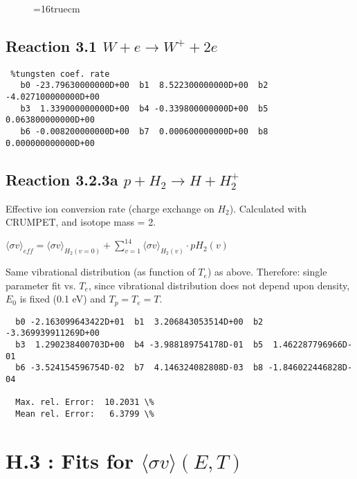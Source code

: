\documentclass[12pt,dvipdfmx]{article}
\begin{document}
\begin{figure} \label{2.26B}
\epsfxsize=16truecm
\end{figure}

\subsection{
Reaction 3.1 $W + e \rightarrow W^+ + 2e $ }

\begin{small}\begin{verbatim} %tungsten coef. rate
   b0 -23.79630000000D+00  b1  8.522300000000D+00  b2 -4.027100000000D+00
   b3  1.339000000000D+00  b4 -0.339800000000D+00  b5  0.063800000000D+00
   b6 -0.008200000000D+00  b7  0.000600000000D+00  b8  0.000000000000D+00
\end{verbatim}\end{small}

\newpage

\subsection{
Reaction 3.2.3a   $p + H_2 \rightarrow H + H_2^+  $
}

  Effective ion conversion rate (charge exchange on $H_2$). Calculated with CRUMPET, and isotope mass = 2. 

  $ \langle\sigma v \rangle_{eff} = \langle\sigma v \rangle_{H_2(v=0)} + \sum_{v=1}^{14}
\langle\sigma v \rangle_{H_2(v)} \cdot pH_2(v) $

  Same vibrational distribution (as function of $T_e$) as above.
  Therefore:
  single parameter fit vs. $T_e$,
  since vibrational distribution does not depend upon density, $E_0$ is fixed
  (0.1 eV) and $T_p = T_e = T$.

\begin{small}\begin{verbatim}
  b0 -2.163099643422D+01  b1  3.206843053514D+00  b2 -3.369939911269D+00
  b3  1.290238400703D+00  b4 -3.988189754178D-01  b5  1.462287796966D-01
  b6 -3.524154596754D-02  b7  4.146324082808D-03  b8 -1.846022446828D-04

  Max. rel. Error:  10.2031 \%
  Mean rel. Error:   6.3799 \%

\end{verbatim}\end{small}

\section{H.3 : Fits for $\langle\sigma v \rangle (E,T)$}\label{sect3}
\end{document}
